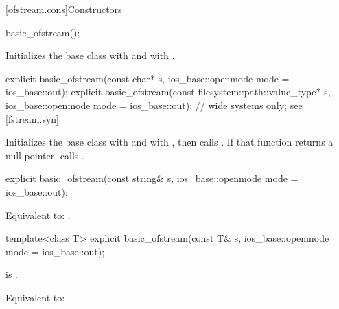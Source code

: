 [ofstream.cons]{Constructors}

%
\begin{itemdecl}
basic_ofstream();
\end{itemdecl}

\begin{itemdescr}
\pnum
\effects
Initializes the base class with
and  with
.
\end{itemdescr}

%
\begin{itemdecl}
explicit basic_ofstream(const char* s,
                        ios_base::openmode mode = ios_base::out);
explicit basic_ofstream(const filesystem::path::value_type* s,
                        ios_base::openmode mode = ios_base::out); // wide systems only; see \ref{fstream.syn}
\end{itemdecl}

\begin{itemdescr}
\pnum
\effects
Initializes the base class with
and  with
,
then calls
.
If that function returns a null pointer, calls
.
\end{itemdescr}

%
\begin{itemdecl}
explicit basic_ofstream(const string& s,
                        ios_base::openmode mode = ios_base::out);
\end{itemdecl}

\begin{itemdescr}
\pnum
\effects
Equivalent to: .
\end{itemdescr}

%
\begin{itemdecl}
template<class T>
  explicit basic_ofstream(const T& s, ios_base::openmode mode = ios_base::out);
\end{itemdecl}

\begin{itemdescr}
\pnum
\constraints
{} is .

\pnum
\effects
Equivalent to: .
\end{itemdescr}

